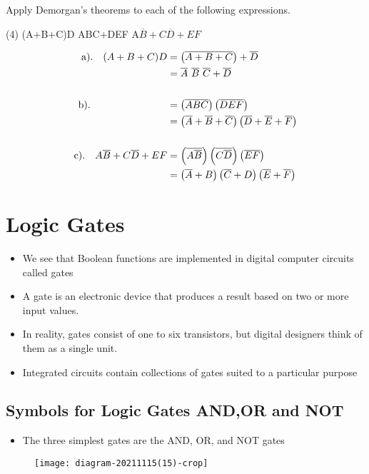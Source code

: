 \begin{exercise}
	Apply Demorgan's theorems to each of the following expressions.\\
	\begin{tasks}(4)
		\task[\textbf{a).}](A+B+C)D
		\task[\textbf{b).}] ABC+DEF
		\task[\textbf{c).}] A$\overline{B}+C\overline{D}+EF$
	\end{tasks}
\end{exercise}
\begin{answer}
	\begin{align*}
	\text{a).}\quad(A+B+C)D&=\left( \overline{A+B+C}\right) +\overline{D}\\
	&=\overline{A}\ \overline{B}\ \overline{C}+\overline{D}\\\\
	\text{b).}\hspace{2.7cm}&= \left( \overline{ABC}\right) \left( \overline{DEF}\right) \\
	&=\left( \overline{A}+\overline{B}+\overline{C}\right) \left(\overline{D}+ \overline{E}+\overline{F}\right) \\\\
	\text{c).}\quad A\overline{B}+C\overline{D}+EF&=\left( \overline{A\overline{B}}\right) \left( \overline{C\overline{D}}\right) \left( \overline{EF}\right)\\
	&=\left( \overline{A}+B\right) \left( \overline{C}+D\right)\left( \overline{E}+\overline{F}\right)
	\end{align*}
\end{answer}
\section{Logic Gates}
\begin{itemize}
	\item We see that Boolean functions are implemented in digital computer circuits called gates
	\item A gate is an electronic device that produces a result based on two or more input values.
	\item In reality, gates consist of one to six transistors, but digital designers think of them as a single unit.
	\item Integrated circuits contain collections of gates suited to a particular purpose
\end{itemize}
\subsection{Symbols for Logic Gates AND,OR and NOT}
\begin{itemize}
	\item The three simplest gates are the AND, OR, and NOT gates
\end{itemize}
\begin{figure}[H]
	\centering
	\texttt{[image: diagram-20211115(15)-crop]}
	\caption{}
	\label{}
\end{figure}
